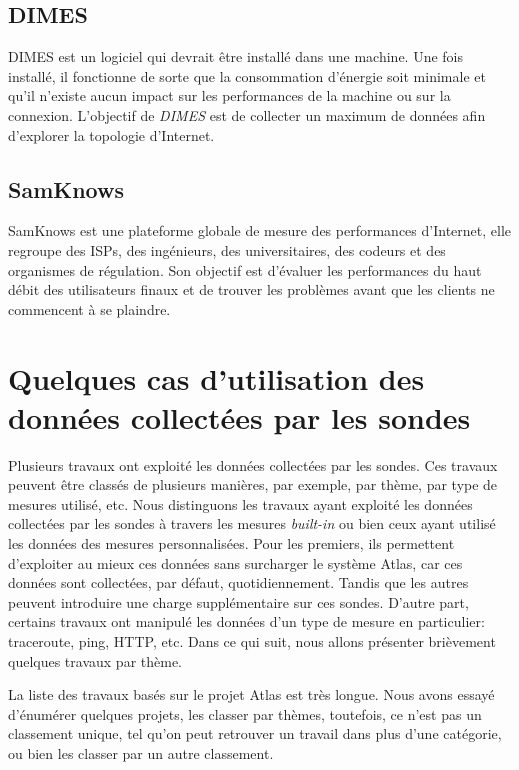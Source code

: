\subsection{DIMES}
DIMES \cite{Shavitt:2005:DLI:1096536.1096546} est un logiciel qui devrait être installé dans une machine. Une fois installé, il fonctionne de sorte que la consommation d'énergie soit minimale et qu'il n'existe aucun impact sur les performances de la machine ou sur la connexion. L'objectif de \textit{DIMES} est de collecter un maximum de données afin d'explorer la topologie d'Internet.


\subsection{SamKnows}
SamKnows \cite{SamKnows}  est une plateforme globale de mesure des performances d'Internet, elle regroupe des ISPs, des ingénieurs, des universitaires, des codeurs et des organismes de régulation. Son objectif est d'évaluer les performances du haut débit des utilisateurs finaux et de trouver les problèmes avant que les clients ne commencent à se plaindre. 

\section{Quelques cas d'utilisation des données collectées par les sondes} \label{use-cases-atlas}
Plusieurs travaux ont exploité les données collectées par les sondes. Ces travaux peuvent être classés de plusieurs manières, par exemple,  par thème,  par  type de mesures utilisé, etc. Nous distinguons les travaux ayant exploité les données collectées par les sondes  à travers les mesures \textit{built-in} ou bien ceux ayant utilisé les données des mesures personnalisées.  Pour les premiers, ils permettent d'exploiter au mieux ces données sans surcharger le système Atlas, car ces données sont collectées, par défaut, quotidiennement. Tandis que les autres peuvent introduire une charge supplémentaire sur ces sondes. D'autre part, certains travaux  ont manipulé  les données d'un  type de mesure en particulier: traceroute, ping,  HTTP, etc. Dans ce qui suit, nous allons présenter brièvement quelques travaux par thème.

La liste des travaux basés sur le projet  Atlas est très longue. Nous avons essayé d'énumérer quelques projets, les classer par thèmes, toutefois, ce n'est pas un classement unique, tel qu'on peut retrouver un travail dans plus d'une catégorie, ou bien les classer par un autre classement. 

